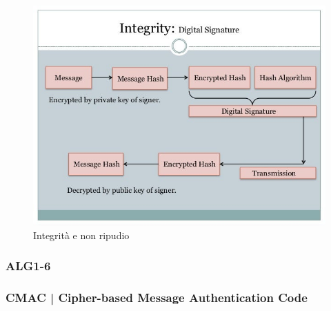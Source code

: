 

\textsf{\small }

\begin{figure}[H]
	\centering
	\includegraphics[width=.9\textwidth, height=.9\textheight, keepaspectratio]{./images/aes_modes/encryption-integrity-and-nonrepudiation.png}
	\caption{Integrità e non ripudio}
	\label{fig:encryption-integrity-and-nonrepudiation}
\end{figure}

\subsubsection{ALG1-6}


\textsf{\small }

\subsubsection{CMAC | Cipher-based Message Authentication Code}

